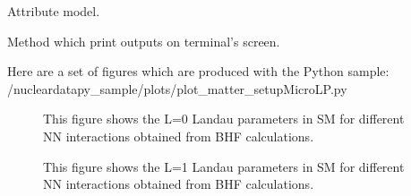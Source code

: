 \documentclass[letterpaper,10pt,english]{sphinxmanual}
\begin{document}
\begin{fulllineitems}
\begin{fulllineitems}
\end{fulllineitems}


\begin{fulllineitems}
\label{\detokenize{source/api/setup_matter_micro_lp:nucleardatapy.matter.setup_micro_lp.setupMicroLP.model}}
\pysigstartsignatures
{}
\pysigstopsignatures
\sphinxAtStartPar
Attribute model.

\end{fulllineitems}


\begin{fulllineitems}
\label{\detokenize{source/api/setup_matter_micro_lp:nucleardatapy.matter.setup_micro_lp.setupMicroLP.print_outputs}}
\pysigstartsignatures
{}
\pysigstopsignatures
\sphinxAtStartPar
Method which print outputs on terminal’s screen.

\end{fulllineitems}


\end{fulllineitems}


\sphinxAtStartPar
Here are a set of figures which are produced with the Python sample: /nucleardatapy\_sample/plots/plot\_matter\_setupMicroLP.py

\begin{figure}[htbp]
\centering
\capstart

\noindent{}
\caption{This figure shows the L=0 Landau parameters in SM for different NN interactions obtained
from BHF calculations.}\label{\detokenize{source/api/setup_matter_micro_lp:id1}}\end{figure}

\begin{figure}[htbp]
\centering
\capstart

\noindent{}
\caption{This figure shows the L=1 Landau parameters in SM for different NN interactions obtained
from BHF calculations.}\label{\detokenize{source/api/setup_matter_micro_lp:id2}}\end{figure}
\end{document}

